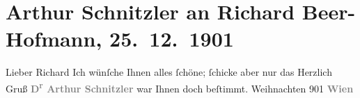 

         
         \renewcommand{\erwaehntePersonen}{Personen: Richard Beer-Hofmann}
         \renewcommand{\erwaehnteOrte}{Orte: Wien}
         \renewcommand{\erwaehnteWerke}{}
               \section[Arthur Schnitzler an Richard Beer-Hofmann, 25. 12. 1901]{ Arthur Schnitzler an Richard Beer-Hofmann, 25. 12. 1901}\nopagebreak{}\rehead{ }\begin{ledgroupsized}[t]{13cm}\normalsize\beginnumbering \toendnotes[C]{\smallbreak\pagebreak[2]} 
\toendnotes[C]{\smallbreak}\pstart\center{}{\pb}Lieber Richard\pend\pstart
           Ich wünſche Ihnen alles ſchöne; ſchicke aber nur das\pend
           \pstart Herzlich Gruß\pend{}\pstart
           \centering{}\textcolor{gray}{\textbf{D\textsuperscript{r} Arthur Schnitzler}}\pend
           \pstart
           \noindent{}\label{K_L01191-1v}\label{K_L01191-1h} war Ihnen doch beſtimmt.\pend
           \pstart
           Weihnachten 901\pend
           \pstart
           \raggedleft{}\textcolor{gray}{\textbf{Wien}}\pend
           
         
         \endnumbering{}\end{ledgroupsized}  \newcommand{\dateiname}{L01191}\newcommand{\titel}{Arthur Schnitzler an Richard Beer-Hofmann, 25. 12. 1901}\newcommand{\editorInnen}{Martin Anton Müller und Gerd-Hermann Susen}
      